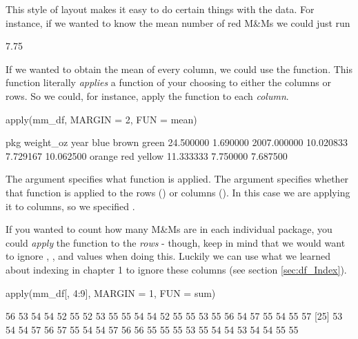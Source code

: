 This style of layout makes it easy to do certain things with the data. For instance, if we wanted to know the mean number of red M\&Ms we could just run 


\begin{outR}
[1] 7.75
\end{outR}

If we wanted to obtain the mean of every column, we could use the  function. This function literally \textit{applies} a function of your choosing to either the columns or rows. So we could, for instance, apply the  function to each \textit{column}.

\begin{inR}
apply(mm_df, MARGIN = 2, FUN = mean)
\end{inR}

\begin{outR}
        pkg   weight_oz        year        blue       brown       green 
  24.500000    1.690000 2007.000000   10.020833    7.729167   10.062500 
     orange         red      yellow 
  11.333333    7.750000    7.687500 
\end{outR}

\noindent
The argument  specifies what function is applied. The argument  specifies whether that function is applied to the rows () or columns (). In this case we are applying it to columns, so we specified .

If you wanted to count how many M\&Ms are in each individual package, you could \textit{apply} the  function to the \textit{rows} - though, keep in mind that we would want to ignore , , and  values when doing this. Luckily we can use what we learned about indexing in chapter 1 to ignore these columns (see section \ref{sec:df_Index}).

\begin{inR}
apply(mm_df[, 4:9], MARGIN = 1, FUN = sum)
\end{inR}

\begin{outR}
 [1] 56 53 54 54 52 55 52 53 55 55 54 54 52 55 55 53 55 56 54 57 55 54 55 57
[25] 53 54 54 57 56 57 55 54 54 57 56 56 55 55 55 53 55 54 54 53 54 54 55 55
\end{outR}

